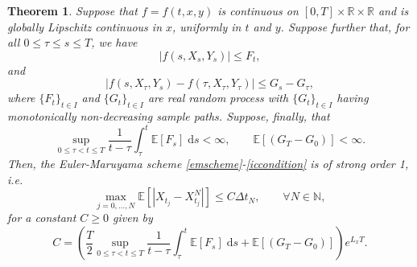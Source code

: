 \documentclass[reqno,12pt]{amsart}
\theoremstyle{plain}%
\newtheorem{thm}{Theorem}[section]
\theoremstyle{definition}
\begin{document}
\begin{thm}
  \label{thmmonotonicbound}
    Suppose that $f=f(t, x, y)$ is continuous on $[0, T]\times \mathbb{R}\times\mathbb{R}$ and is globally Lipschitz continuous in $x$, uniformly in $t$ and $y$. Suppose further that, for all $0 \leq \tau \leq s \leq T$, we have
    \begin{equation}
      |f(s, X_s, Y_s)| \leq F_t,
    \end{equation}
    and
    \begin{equation}
      \label{thmhypmonotonicbound}
        |f(s, X_\tau, Y_s) - f(\tau, X_\tau, Y_\tau)| \leq G_s - G_\tau,
    \end{equation}
    where $\{F_t\}_{t\in I}$ and $\{G_t\}_{t\in I}$ are real random process with $\{G_t\}_{t\in I}$ having monotonically non-decreasing sample paths. Suppose, finally, that
    \[
        \sup_{0 \leq \tau < t \leq T}\frac{1}{t - \tau}\int_\tau^t \mathbb{E}[F_s]\;\mathrm{d}s < \infty, \qquad \mathbb{E}[(G_T - G_0)] < \infty.
    \]
    Then, the Euler-Maruyama scheme \eqref{emscheme}-\eqref{iccondition} is of strong order 1, i.e.
    \begin{equation}
      \label{thmmonotonicboundstrongorder}
        \max_{j=0, \ldots, N}\mathbb{E}\left[ \left| X_{t_j} - X_{t_j}^N \right| \right] \leq C \Delta t_N, \qquad \forall N \in \mathbb{N},
    \end{equation}
    for a constant $C \geq 0$ given by
    \begin{equation}
      \label{thmmonotonicboundconstant}
      C = \left(\frac{T}{2}\sup_{0 \leq \tau < t \leq T}\frac{1}{t - \tau}\int_\tau^t \mathbb{E}[F_s]\;\mathrm{d}s + \mathbb{E}[(G_{T} - G_0)] \right)e^{L_x T}.
    \end{equation}
\end{thm}
\end{document}
